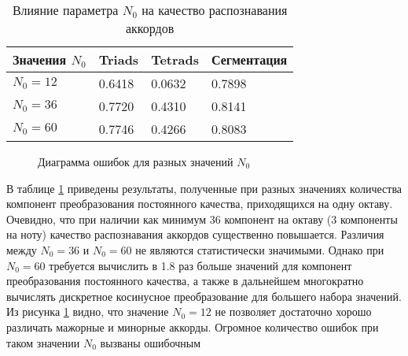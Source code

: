 \begin{table} [htbp]
  \centering
  \parbox{15cm}{\caption{Влияние параметра $N_0$ на качество распознавания
  аккордов} \label{TN0}}
  \begin{tabular}{|l|l|l|l|}
  \hline
  Значения $N_0$ & Triads & Tetrads & Сегментация \\
  \hline
  $N_0 = 12$ & 0.6418 & 0.0632 & 0.7898 \\
  $N_0 = 36$ & 0.7720 & 0.4310 & 0.8141 \\
  $N_0 = 60$ & 0.7746 & 0.4266 & 0.8083 \\
  \hline
  \end{tabular}
\end{table}

\begin{figure}[htbp]
  \begin{minipage}[h]{0.49\linewidth}
  \end{minipage}
  \hfill
  \begin{minipage}[h]{0.49\linewidth}
  \end{minipage}
  \hfill
  \begin{minipage}[h]{0.49\linewidth}
  \end{minipage}
  \hfill
  \begin{minipage}[h]{0.49\linewidth}
  \end{minipage}
  \caption{Диаграмма ошибок для разных значений $N_0$}
  \label{img:n0}
\end{figure}

В таблице \ref{TN0} приведены результаты, полученные при разных значениях
количества компонент преобразования постоянного качества, приходящихся на одну
октаву. Очевидно, что при наличии как минимум 36 компонент на октаву (3
компоненты на ноту) качество распознавания аккордов существенно повышается.
Различия между $N_0=36$ и $N_0=60$ не являются статистически значимыми. Однако
при $N_0=60$ требуется вычислить в 1.8 раз больше значений для компонент
преобразования постоянного качества, а также в дальнейшем многократно вычислять
дискретное косинусное преобразование для большего набора значений. Из рисунка
\ref{img:n0} видно, что значение $N_0=12$ не позволяет достаточно хорошо
различать мажорные и минорные аккорды. Огромное количество ошибок при таком
значении $N_0$ вызваны ошибочным 

